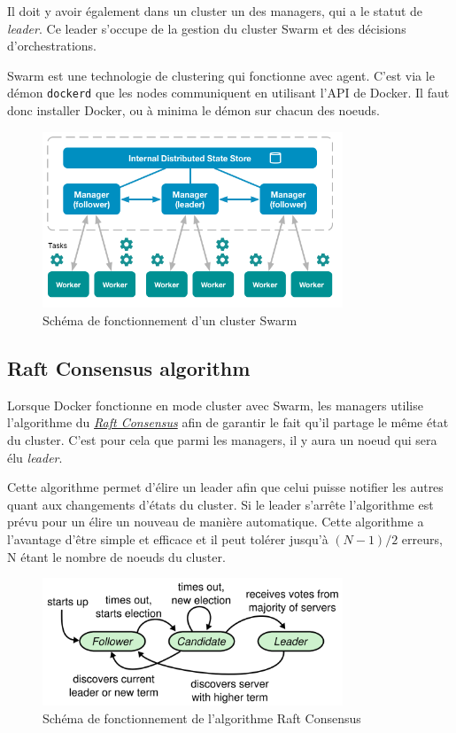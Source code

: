 Il doit y avoir également dans un cluster un des managers, qui a le statut de \emph{leader}.
Ce leader s'occupe de la gestion du cluster Swarm et des décisions d'orchestrations.

Swarm est une technologie de clustering qui fonctionne avec agent. C'est via le démon
\verb:dockerd: que les nodes communiquent en utilisant l'API de Docker. Il faut donc installer
Docker, ou à minima le démon sur chacun des noeuds.

\begin{figure}[h!]
    \centering
    \includegraphics[width=0.8\textwidth]{img/swarm-network}
    \caption{Schéma de fonctionnement d'un cluster Swarm}
\end{figure}

\subsection{Raft Consensus algorithm}

Lorsque Docker fonctionne en mode cluster avec Swarm, les managers utilise l'algorithme du
\href{https://raft.github.io/}{\emph{Raft Consensus}} afin de garantir le fait qu'il partage le
même état du cluster. C'est pour cela que parmi les managers, il y aura un noeud qui sera élu
\emph{leader}.\newline

Cette algorithme permet d'élire un leader afin que celui puisse notifier les autres quant aux
changements d'états du cluster. Si le leader s'arrête l'algorithme est prévu pour un élire un
nouveau de manière automatique. Cette algorithme a l'avantage d'être simple et efficace et il
peut tolérer jusqu'à $(N - 1) / 2$ erreurs, N étant le nombre de noeuds du cluster.

\begin{figure}[h!]
    \centering
    \includegraphics[width=0.8\textwidth]{img/raft}
    \caption{Schéma de fonctionnement de l'algorithme Raft Consensus}
\end{figure}

